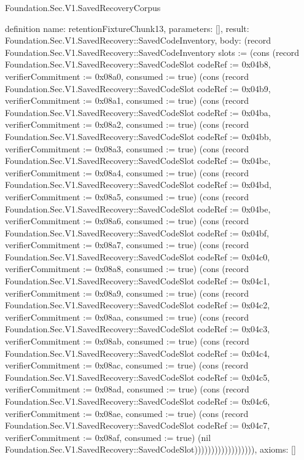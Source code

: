 \begin{lexlean}{Foundation.Sec.V1.SavedRecoveryCorpus}
\begin{semanticmodule}
definition{
  name: retentionFixtureChunk13,
  parameters: [],
  result: Foundation.Sec.V1.SavedRecovery::SavedCodeInventory,
  body: (record Foundation.Sec.V1.SavedRecovery::SavedCodeInventory {slots := (cons (record Foundation.Sec.V1.SavedRecovery::SavedCodeSlot {codeRef := 0x04b8, verifierCommitment := 0x08a0, consumed := true}) (cons (record Foundation.Sec.V1.SavedRecovery::SavedCodeSlot {codeRef := 0x04b9, verifierCommitment := 0x08a1, consumed := true}) (cons (record Foundation.Sec.V1.SavedRecovery::SavedCodeSlot {codeRef := 0x04ba, verifierCommitment := 0x08a2, consumed := true}) (cons (record Foundation.Sec.V1.SavedRecovery::SavedCodeSlot {codeRef := 0x04bb, verifierCommitment := 0x08a3, consumed := true}) (cons (record Foundation.Sec.V1.SavedRecovery::SavedCodeSlot {codeRef := 0x04bc, verifierCommitment := 0x08a4, consumed := true}) (cons (record Foundation.Sec.V1.SavedRecovery::SavedCodeSlot {codeRef := 0x04bd, verifierCommitment := 0x08a5, consumed := true}) (cons (record Foundation.Sec.V1.SavedRecovery::SavedCodeSlot {codeRef := 0x04be, verifierCommitment := 0x08a6, consumed := true}) (cons (record Foundation.Sec.V1.SavedRecovery::SavedCodeSlot {codeRef := 0x04bf, verifierCommitment := 0x08a7, consumed := true}) (cons (record Foundation.Sec.V1.SavedRecovery::SavedCodeSlot {codeRef := 0x04c0, verifierCommitment := 0x08a8, consumed := true}) (cons (record Foundation.Sec.V1.SavedRecovery::SavedCodeSlot {codeRef := 0x04c1, verifierCommitment := 0x08a9, consumed := true}) (cons (record Foundation.Sec.V1.SavedRecovery::SavedCodeSlot {codeRef := 0x04c2, verifierCommitment := 0x08aa, consumed := true}) (cons (record Foundation.Sec.V1.SavedRecovery::SavedCodeSlot {codeRef := 0x04c3, verifierCommitment := 0x08ab, consumed := true}) (cons (record Foundation.Sec.V1.SavedRecovery::SavedCodeSlot {codeRef := 0x04c4, verifierCommitment := 0x08ac, consumed := true}) (cons (record Foundation.Sec.V1.SavedRecovery::SavedCodeSlot {codeRef := 0x04c5, verifierCommitment := 0x08ad, consumed := true}) (cons (record Foundation.Sec.V1.SavedRecovery::SavedCodeSlot {codeRef := 0x04c6, verifierCommitment := 0x08ae, consumed := true}) (cons (record Foundation.Sec.V1.SavedRecovery::SavedCodeSlot {codeRef := 0x04c7, verifierCommitment := 0x08af, consumed := true}) (nil Foundation.Sec.V1.SavedRecovery::SavedCodeSlot)))))))))))))))))}),
  axioms: []
}


\end{semanticmodule}
\end{lexlean}

